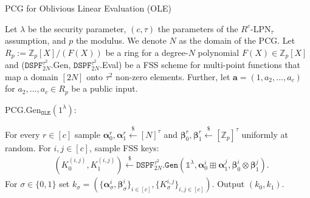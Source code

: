 \begin{specialconstruction}{PCG for Oblivious Linear Evaluation (OLE)}
\label{construction:PCGforOLEImpl}
\vspace{1em} 

Let $\lambda$ be the security parameter, $(c,\tau)$ the parameters of the $R^c$-LPN$_\tau$ assumption, and $p$ the modulus. We denote $N$ as the domain of the PCG. Let $R_p:=\mathbb{Z}_{p}[X]/(F(X))$ be a ring for a degree-$N$ polynomial $F(X) \in \mathbb{Z}_{p}[X]$ and ($\texttt{DSPF}^{\tau^2}_{2N}$.Gen, $\texttt{DSPF}^{\tau^2}_{2N}$.Eval) be a FSS scheme for multi-point functions that map a domain $[2N]$ onto $\tau^2$ non-zero elements. Further, let $\boldsymbol{a} = (1, a_2, ..., a_c)$ for $a_2, ...,a_c \in R_p$ be a public input.

\vspace{1em} 

PCG.Gen$_{\texttt{OLE}}(1^\lambda)$:
\begin{algorithmic}[1]
\State For every $r \in [c]$ sample $\boldsymbol{\alpha}_{0}^{r}, \boldsymbol{\alpha}_{1}^{r} \stackrel{\$}{\leftarrow}[N]^{\tau}$ and $\boldsymbol{\beta}_{0}^{r}, \boldsymbol{\beta}_{1}^{r} \stackrel{\$}{\leftarrow} [\mathbb{Z}_{p}]^{\tau}$ uniformly at random.
\State For $i, j \in [c]$, sample FSS keys:
\begin{align*}
& \left(K_{0}^{(i, j)}, K_{1}^{(i, j)}\right) \stackrel{\$}{\leftarrow} \texttt{DSPF}^{\tau^2}_{2N}\texttt{.Gen}\left(\mathds{1}^{\lambda}, \boldsymbol{\alpha}_{0}^{i} \boxplus \boldsymbol{\alpha}_{1}^{j}, \boldsymbol{\beta}_{0}^{i} \otimes \boldsymbol{\beta}_{1}^{j}\right).
\end{align*}
\State For $\sigma \in \{0,1\}$ set $k_\sigma = (\{\boldsymbol{\alpha}_\sigma^i, \boldsymbol{\beta}_\sigma^i\}_{i\in[c]}, \{K_\sigma^{i,j}\}_{i,j\in[c]})$.
\State Output $(k_0, k_1)$.
\end{algorithmic}

\vspace{1em} %


\end{specialconstruction}
